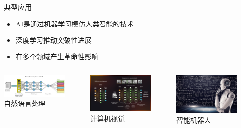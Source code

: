 \begin{frame}{典型应用}
  \begin{itemize}
	  \item \textrm{AI}是通过机器学习模仿人类智能的技术
    \item 深度学习推动突破性进展
    \item 在多个领域产生革命性影响
  \end{itemize}

  \begin{columns}
    \centering
    \includegraphics[width=0.8\textwidth]{Figures/AI_Deeplearning-NLP.png}\\
    自然语言处理

    \centering
    \includegraphics[width=0.8\textwidth]{Figures/AI_Deeplearning-CV.png}\\
    计算机视觉

    \centering
    \includegraphics[width=0.8\textwidth]{Figures/AI_Robot-AI-machine-learning-hero.jpg}\\
    智能机器人
  \end{columns}


\end{frame}
